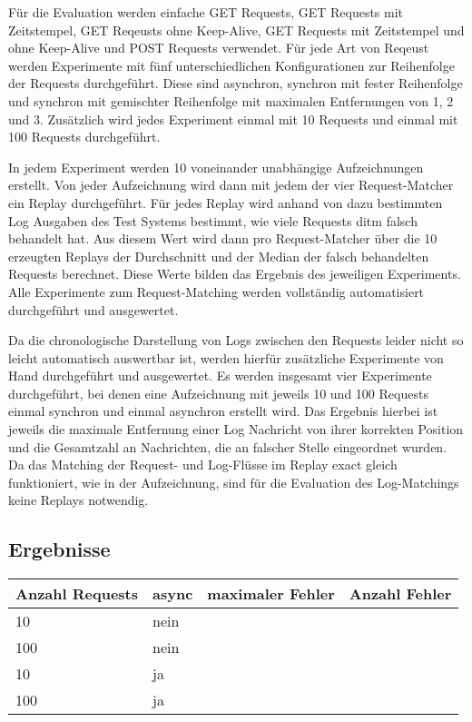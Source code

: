 \documentclass[a4paper]{report}
\begin{document}
Für die Evaluation werden einfache GET Requests, GET Requests mit Zeitstempel, GET Reqeusts ohne Keep-Alive, GET Requests mit
Zeitstempel und ohne Keep-Alive und POST Requests verwendet. Für jede Art von Reqeust werden Experimente mit fünf unterschiedlichen
Konfigurationen zur Reihenfolge der Requests durchgeführt. Diese sind asynchron, synchron mit fester Reihenfolge und synchron mit gemischter
Reihenfolge mit maximalen Entfernungen von 1, 2 und 3. Zusätzlich wird jedes Experiment einmal mit 10 Requests und einmal mit 100 Requests
durchgeführt.

In jedem Experiment werden 10 voneinander unabhängige Aufzeichnungen erstellt. Von jeder Aufzeichnung wird dann mit jedem der vier
Request-Matcher ein Replay durchgeführt. Für jedes Replay wird anhand von dazu bestimmten Log Ausgaben des Test Systems bestimmt,
wie viele Requests ditm falsch behandelt hat. Aus diesem Wert wird dann pro Request-Matcher über die 10 erzeugten Replays der Durchschnitt
und der Median der falsch behandelten Requests berechnet. Diese Werte bilden das Ergebnis des jeweiligen Experiments.
Alle Experimente zum Request-Matching werden vollständig automatisiert durchgeführt und ausgewertet. %

Da die chronologische Darstellung von Logs zwischen den Requests leider nicht so leicht automatisch auswertbar ist, werden hierfür
zusätzliche Experimente von Hand durchgeführt und ausgewertet. Es werden insgesamt vier Experimente durchgeführt, bei denen eine
Aufzeichnung mit jeweils 10 und 100 Requests einmal synchron und einmal asynchron erstellt wird. Das Ergebnis hierbei ist jeweils
die maximale Entfernung einer Log Nachricht von ihrer korrekten Position und die Gesamtzahl an Nachrichten, die an falscher Stelle
eingeordnet wurden. Da das Matching der Request- und Log-Flüsse im Replay exact gleich funktioniert, wie in der Aufzeichnung, sind
für die Evaluation des Log-Matchings keine Replays notwendig.

\subsection{Ergebnisse}
\begin{table}
	\begin{tabular}{|l|l|l|l|}
		\hline
		Anzahl Requests & async & maximaler Fehler & Anzahl Fehler \\ \hline
		10              & nein  &                  &               \\ \hline
		100             & nein  &                  &               \\ \hline
		10              & ja    &                  &               \\ \hline
		100             & ja    &                  &               \\ \hline
	\end{tabular}
\end{table}
\end{document}
